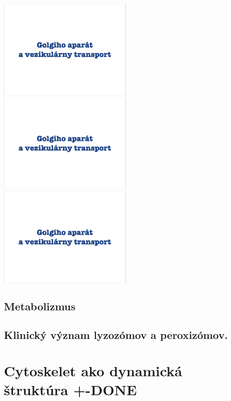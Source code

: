 \includegraphics[width=0.5\textwidth, page=5]{materials/Bunkova_biologia/prednasky_zaklady_bunkovej_biologie/10_ZBB10-GA.pdf}\\
\includegraphics[width=0.5\textwidth, page=10]{materials/Bunkova_biologia/prednasky_zaklady_bunkovej_biologie/10_ZBB10-GA.pdf}\\
\includegraphics[width=0.5\textwidth, page=11]{materials/Bunkova_biologia/prednasky_zaklady_bunkovej_biologie/10_ZBB10-GA.pdf}\\

\subsection{Metabolizmus}

\subsection{Klinický význam lyzozómov a peroxizómov. }

\section{Cytoskelet ako dynamická štruktúra +-DONE}


